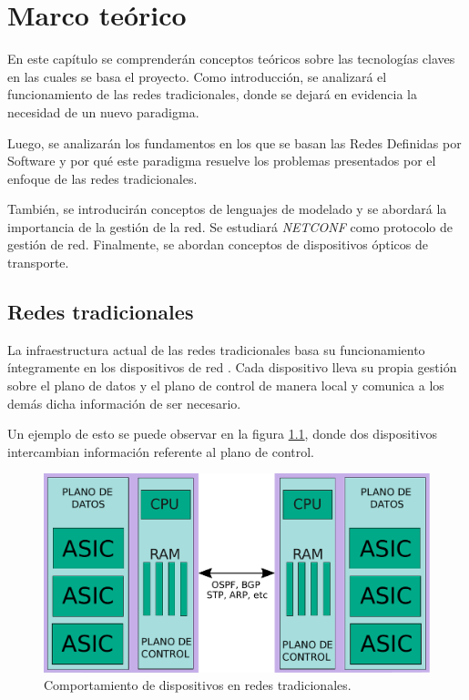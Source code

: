 \chapter{Marco teórico} %

\label{Chapter2} %
En este capítulo se comprenderán conceptos teóricos sobre las tecnologías claves en las cuales se basa el proyecto. Como introducción, se analizará el funcionamiento de las redes tradicionales, donde se dejará en evidencia la necesidad de un nuevo paradigma. 

Luego, se analizarán los fundamentos en los que se basan las Redes Definidas por Software y por qué este paradigma resuelve los problemas presentados por el enfoque de las redes tradicionales. 

También, se introducirán conceptos de lenguajes de modelado y se abordará la importancia de la gestión de la red. Se estudiará \textit{NETCONF} como protocolo de gestión de red. Finalmente, se abordan conceptos de dispositivos ópticos de transporte.

\section{Redes tradicionales} \label{sec:rdtr}

La infraestructura actual de las redes tradicionales basa su funcionamiento íntegramente en los dispositivos de red \parencite{ISACA}. Cada dispositivo lleva su propia gestión sobre el plano de datos y el plano de control de manera local y comunica a los demás dicha información de ser necesario. 

Un ejemplo de esto se puede observar en la figura \ref{fig:dev_tradicional}, donde dos dispositivos intercambian información referente al plano de control.


\begin{figure}[H]
	\centering
	\includegraphics[scale=0.60]{Figures/dispositivo-tradicional.pdf}
	\caption{Comportamiento de dispositivos en redes tradicionales.}
	\label{fig:dev_tradicional}
  \end{figure}


